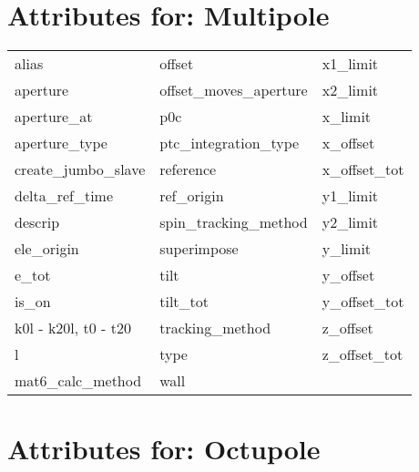  \section{Attributes for: Multipole}
 \label{s:list.multipole}
 
 \begin{tabular}{lll} \toprule
alias                       & offset                      & x1_limit                    \\
aperture                    & offset_moves_aperture       & x2_limit                    \\
aperture_at                 & p0c                         & x_limit                     \\
aperture_type               & ptc_integration_type        & x_offset                    \\
create_jumbo_slave          & reference                   & x_offset_tot                \\
delta_ref_time              & ref_origin                  & y1_limit                    \\
descrip                     & spin_tracking_method        & y2_limit                    \\
ele_origin                  & superimpose                 & y_limit                     \\
e_tot                       & tilt                        & y_offset                    \\
is_on                       & tilt_tot                    & y_offset_tot                \\
k0l - k20l, t0 - t20        & tracking_method             & z_offset                    \\
l                           & type                        & z_offset_tot                \\
mat6_calc_method            & wall                        &                             \\
 \bottomrule
 \end{tabular}
 \vfill
 
 \section{Attributes for: Octupole}
 \label{s:list.octupole}
 
